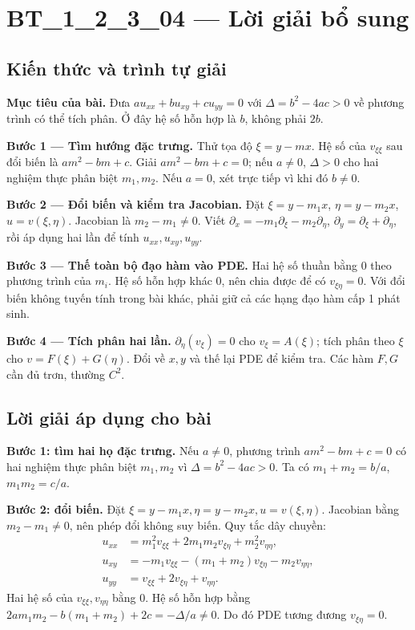 \documentclass[10pt,a4paper]{article}
\begin{document}
\section*{BT\_1\_2\_3\_04 — Lời giải bổ sung}
\subsection*{Kiến thức và trình tự giải}
\textbf{Mục tiêu của bài.} Đưa $au_{xx}+bu_{xy}+cu_{yy}=0$ với $\Delta=b^2-4ac>0$ về phương trình có thể tích phân. Ở đây hệ số hỗn hợp là $b$, không phải $2b$.

\textbf{Bước 1 — Tìm hướng đặc trưng.} Thử tọa độ $\xi=y-mx$. Hệ số của $v_{\xi\xi}$ sau đổi biến là $am^2-bm+c$. Giải $am^2-bm+c=0$; nếu $a\ne0$, $\Delta>0$ cho hai nghiệm thực phân biệt $m_1,m_2$. Nếu $a=0$, xét trực tiếp vì khi đó $b\ne0$.

\textbf{Bước 2 — Đổi biến và kiểm tra Jacobian.} Đặt $\xi=y-m_1x$, $\eta=y-m_2x$, $u=v(\xi,\eta)$. Jacobian là $m_2-m_1\ne0$. Viết $\partial_x=-m_1\partial_\xi-m_2\partial_\eta$, $\partial_y=\partial_\xi+\partial_\eta$, rồi áp dụng hai lần để tính $u_{xx},u_{xy},u_{yy}$.

\textbf{Bước 3 — Thế toàn bộ đạo hàm vào PDE.} Hai hệ số thuần bằng 0 theo phương trình của $m_i$. Hệ số hỗn hợp khác 0, nên chia được để có $v_{\xi\eta}=0$. Với đổi biến không tuyến tính trong bài khác, phải giữ cả các hạng đạo hàm cấp 1 phát sinh.

\textbf{Bước 4 — Tích phân hai lần.} $\partial_\eta(v_\xi)=0$ cho $v_\xi=A(\xi)$; tích phân theo $\xi$ cho $v=F(\xi)+G(\eta)$. Đổi về $x,y$ và thế lại PDE để kiểm tra. Các hàm $F,G$ cần đủ trơn, thường $C^2$.
\subsection*{Lời giải áp dụng cho bài}
\textbf{Bước 1: tìm hai họ đặc trưng.} Nếu $a\ne0$, phương trình $am^2-bm+c=0$ có hai nghiệm thực phân biệt $m_1,m_2$ vì $\Delta=b^2-4ac>0$. Ta có $m_1+m_2=b/a$, $m_1m_2=c/a$.

\textbf{Bước 2: đổi biến.} Đặt $\xi=y-m_1x,\eta=y-m_2x,u=v(\xi,\eta)$. Jacobian bằng $m_2-m_1\ne0$, nên phép đổi không suy biến. Quy tắc dây chuyền:
\begin{align*}
u_{xx}&=m_1^2v_{\xi\xi}+2m_1m_2v_{\xi\eta}+m_2^2v_{\eta\eta},\\
u_{xy}&=-m_1v_{\xi\xi}-(m_1+m_2)v_{\xi\eta}-m_2v_{\eta\eta},\\
u_{yy}&=v_{\xi\xi}+2v_{\xi\eta}+v_{\eta\eta}.
\end{align*}
Hai hệ số của $v_{\xi\xi},v_{\eta\eta}$ bằng 0. Hệ số hỗn hợp bằng $2am_1m_2-b(m_1+m_2)+2c=-\Delta/a\ne0$. Do đó PDE tương đương $v_{\xi\eta}=0$.
\end{document}
